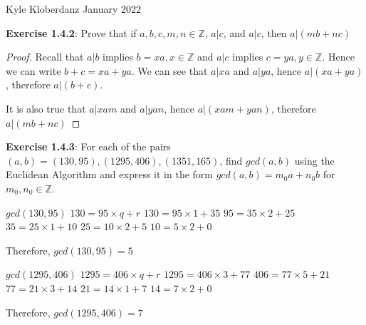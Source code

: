 \documentclass[a4paper]{article}
\begin{document}
\begin{myparindent}{0pt}

Kyle Kloberdanz  January 2022 \newline

\textbf{Exercise 1.4.2}:
Prove that if $a, b, c, m, n \in \mathbb{Z}$, $a|c$, and $a|c$, then
$a|(mb + nc)$
\begin{proof}
Recall that $a|b$ implies $b = xa, x \in \mathbb{Z}$
and $a|c$ implies $c = ya, y \in \mathbb{Z}$. Hence we can write
$b + c = xa + ya$. We can see that $a | xa$ and $a | ya$, hence $a | (xa + ya)$,
therefore $a | (b + c)$.
\newline

It is also true that $a | xam$ and $a | yan$, hence $a | (xam + yan)$,
therefore \newline
$a | (mb + nc)$
\end{proof}

\textbf{Exercise 1.4.3}:
For each of the pairs $(a, b) = (130, 95), (1295, 406), (1351, 165)$, find $gcd(a, b)$
using the Euclidean Algorithm and express it in the form $gcd(a, b) = m_0 a + n_0 b$
for $m_0, n_0 \in \mathbb{Z}$. \newline

$gcd(130, 95)$ \newline
$130 = 95 \times q + r$ \newline
$130 = 95 \times 1 + 35$ \newline
$95 = 35 \times 2 + 25$ \newline
$35 = 25 \times 1 + 10$ \newline
$25 = 10 \times 2 + 5$ \newline
$10 = 5 \times 2 + 0$ \newline

Therefore, $gcd(130, 95) = 5$ \newline

$gcd(1295, 406)$ \newline
$1295 = 406 \times q + r$ \newline
$1295 = 406 \times 3 + 77$ \newline
$406 = 77 \times 5 + 21$ \newline
$77 = 21 \times 3 + 14$ \newline
$21 = 14 \times 1 + 7$ \newline
$14 = 7 \times 2 + 0$ \newline

Therefore, $gcd(1295, 406) = 7$ \newline


\end{myparindent}
\end{document}
